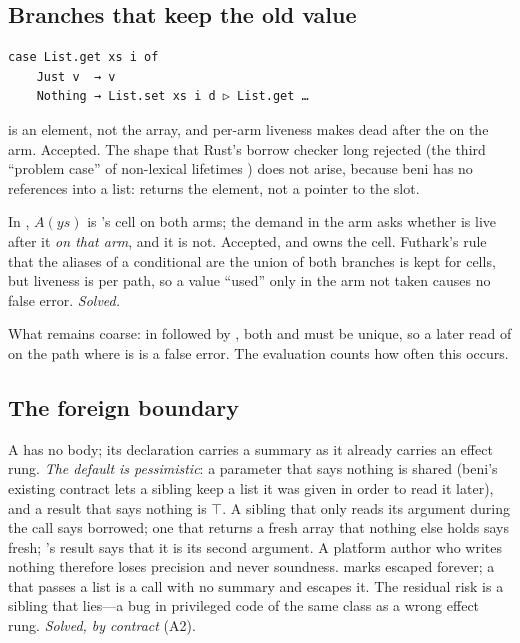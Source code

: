 \subsection{Branches that keep the old value}
\label{sec:hard-branches}

\begin{Verbatim}
case List.get xs i of
    Just v  → v
    Nothing → List.set xs i d ▷ List.get …
\end{Verbatim}
 is an element, not the array, and per-arm liveness makes  dead after the  on
the  arm. Accepted. The shape that Rust's borrow checker long rejected (the third
``problem case'' of non-lexical lifetimes \citep{rfc2094}) does not arise, because beni has no
references into a list:  returns the element, not a pointer to the slot.

In , $A(\mathit{ys})$ is 's cell on both arms;
the demand in the  arm asks whether  is live after it \emph{on that arm}, and it is
not. Accepted, and  owns the cell. Futhark's rule that the aliases of a conditional are the
union of both branches \citep[Fig.~5]{henriksen2017futhark} is kept for cells, but liveness is per path,
so a value ``used'' only in the arm not taken causes no false error. \emph{Solved.}

What remains coarse: in  followed by , both 
and  must be unique, so a later read of  on the path where  is  is a
false error. The evaluation counts how often this occurs.

\subsection{The foreign boundary}
\label{sec:hard-foreign}

A  has no body; its declaration carries a summary as it already carries an effect rung.
\emph{The default is pessimistic}: a parameter that says nothing is shared (beni's existing contract
lets a sibling keep a list it was given in order to read it later), and a result that says nothing is
$\top$. A sibling that only reads its argument during the call says borrowed; one that returns a fresh
array that nothing else holds says fresh; 's result says that it is its second
argument. A platform author who writes nothing therefore loses precision and never soundness.
 marks  escaped forever; a  that passes a list is a call with no
summary and escapes it. The residual risk is a sibling that lies---a bug in privileged code of the same
class as a wrong effect rung. \emph{Solved, by contract} (A2).

